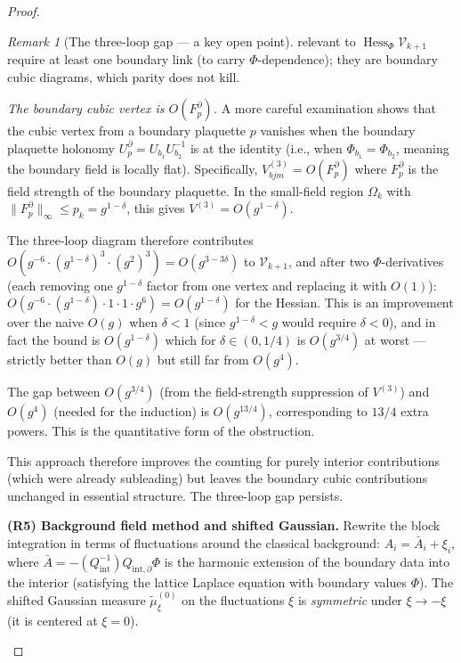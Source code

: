 \documentclass[11pt,a4paper]{article}
\theoremstyle{plain}
\theoremstyle{definition}
\theoremstyle{remark}
\newtheorem{remark}[theorem]{Remark}
\newcommand{\Hess}{\operatorname{Hess}}
\newcommand{\cV}{\mathcal{V}}
\begin{document}
\begin{proof}
\begin{remark}[The three-loop gap --- a key open point]
relevant to $\Hess_\Phi \cV_{k+1}$ require at least
one boundary link (to carry $\Phi$-dependence); they
are boundary cubic diagrams, which parity does not kill.

\emph{The boundary cubic vertex is $O(F_p^\partial)$.}
A more careful examination shows that the cubic vertex
from a boundary plaquette $p$ vanishes when the boundary
plaquette holonomy $U_p^\partial = U_{b_1} U_{b_2}^{-1}$
is at the identity (i.e., when $\Phi_{b_1} = \Phi_{b_2}$,
meaning the boundary field is locally flat). Specifically,
$V^{(3)}_{b j m} = O(F_p^\partial)$ where $F_p^\partial$
is the field strength of the boundary plaquette.
In the small-field region $\Omega_k$ with
$\|F_p^\partial\|_\infty \le p_k = g^{1-\delta}$,
this gives $V^{(3)} = O(g^{1-\delta})$.

The three-loop diagram therefore contributes
$O(g^{-6} \cdot (g^{1-\delta})^3 \cdot (g^2)^3)
= O(g^{3-3\delta})$ to $\cV_{k+1}$, and after two
$\Phi$-derivatives (each removing one $g^{1-\delta}$ factor
from one vertex and replacing it with $O(1)$):
$O(g^{-6} \cdot (g^{1-\delta}) \cdot 1 \cdot 1 \cdot g^6)
= O(g^{1-\delta})$ for the Hessian.
This is an improvement over the naive $O(g)$ when
$\delta < 1$ (since $g^{1-\delta} < g$ would require
$\delta < 0$), and in fact the bound is
$O(g^{1-\delta})$ which for $\delta \in (0,1/4)$
is $O(g^{3/4})$ at worst --- strictly better than $O(g)$
but still far from $O(g^4)$.

The gap between $O(g^{3/4})$ (from the field-strength
suppression of $V^{(3)}$) and $O(g^4)$ (needed for the
induction) is $O(g^{13/4})$, corresponding to $13/4$
extra powers. This is the quantitative form of the
obstruction.

This approach therefore improves the counting for purely
interior contributions (which were already subleading)
but leaves the boundary cubic contributions unchanged
in essential structure.
The three-loop gap persists.

\textbf{(R5) Background field method and shifted Gaussian.}
Rewrite the block integration in terms of fluctuations
around the classical background: $A_i = \bar{A}_i + \xi_i$,
where $\bar{A} = -(Q_\mathrm{int}^{-1})Q_{\mathrm{int},\partial}\Phi$
is the harmonic extension of the boundary data into the
interior (satisfying the lattice Laplace equation with
boundary values $\Phi$). The shifted Gaussian measure
$\tilde\mu^{(0)}_\xi$ on the fluctuations $\xi$ is
\emph{symmetric} under $\xi \to -\xi$ (it is centered
at $\xi = 0$).


\end{remark}
\end{proof}
\end{document}
